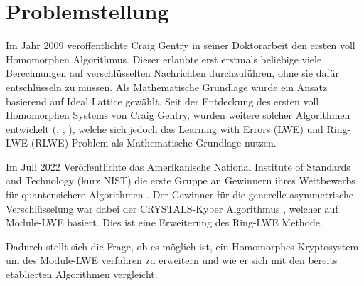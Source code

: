 \chapter{Problemstellung}
\label{Problemstellung}

Im Jahr 2009 veröffentlichte Craig Gentry in seiner Doktorarbeit \cite{Gentry2009AFH} den ersten voll Homomorphen Algorithmus. Dieser erlaubte erst erstmals beliebige viele Berechnungen auf verschlüsselten Nachrichten durchzuführen, ohne sie dafür entschlüsseln zu müssen. Als Mathematische Grundlage wurde ein Ansatz basierend auf \glqq Ideal Lattice\grqq{} gewählt. Seit der Entdeckung des ersten voll Homomorphen Systems von Craig Gentry, wurden weitere solcher Algorithmen entwickelt (\cite{BGV}, \cite{FV}, \cite{GSW}), welche sich jedoch das Learning with Errors (LWE) und Ring-LWE (RLWE) Problem als Mathematische Grundlage nutzen.

Im Juli 2022 Veröffentlichte das Amerikanische National Institute of Standards and Technology (kurz NIST) die erste Gruppe an Gewinnern ihres Wettbewerbs für quantensichere Algorithmen \cite{nistAnouncement}. Der Gewinner für die generelle asymmetrische Verschlüsselung war dabei der CRYSTALS-Kyber Algorithmus \cite{crystalsKyberWeb}, welcher auf Module-LWE basiert. Dies ist eine Erweiterung des Ring-LWE Methode.

Dadurch stellt sich die Frage, ob es möglich ist, ein Homomorphes Kryptosystem um des Module-LWE verfahren zu erweitern und wie er sich mit den bereits etablierten Algorithmen vergleicht.